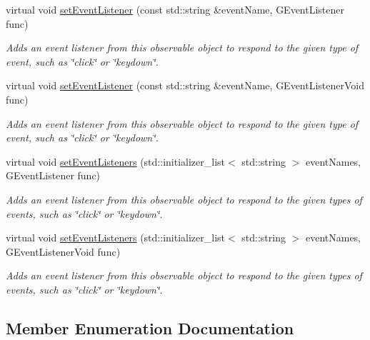 \begin{DoxyCompactItemize}
virtual void \mbox{\hyperlink{classGObservable_ad2f6d34961c50f6c1e0659990b79f741}{set\+Event\+Listener}} (const std\+::string \&event\+Name, G\+Event\+Listener func)
\begin{DoxyCompactList}\small\item\em Adds an event listener from this observable object to respond to the given type of event, such as \char`\"{}click\char`\"{} or \char`\"{}keydown\char`\"{}. \end{DoxyCompactList}\item 
virtual void \mbox{\hyperlink{classGObservable_abac4cb9f9e626e010e87f5d91573c8a5}{set\+Event\+Listener}} (const std\+::string \&event\+Name, G\+Event\+Listener\+Void func)
\begin{DoxyCompactList}\small\item\em Adds an event listener from this observable object to respond to the given type of event, such as \char`\"{}click\char`\"{} or \char`\"{}keydown\char`\"{}. \end{DoxyCompactList}\item 
virtual void \mbox{\hyperlink{classGObservable_afa388d69c33c718cf035774604065604}{set\+Event\+Listeners}} (std\+::initializer\+\_\+list$<$ std\+::string $>$ event\+Names, G\+Event\+Listener func)
\begin{DoxyCompactList}\small\item\em Adds an event listener from this observable object to respond to the given types of events, such as \char`\"{}click\char`\"{} or \char`\"{}keydown\char`\"{}. \end{DoxyCompactList}\item 
virtual void \mbox{\hyperlink{classGObservable_a7867184bbb686f74fae8a4db927da799}{set\+Event\+Listeners}} (std\+::initializer\+\_\+list$<$ std\+::string $>$ event\+Names, G\+Event\+Listener\+Void func)
\begin{DoxyCompactList}\small\item\em Adds an event listener from this observable object to respond to the given types of events, such as \char`\"{}click\char`\"{} or \char`\"{}keydown\char`\"{}. \end{DoxyCompactList}\end{DoxyCompactItemize}


\subsection{Member Enumeration Documentation}
\mbox{\label{classGContainer_a1b7da28ed84c0763e8f92cde2df4799b}} 
